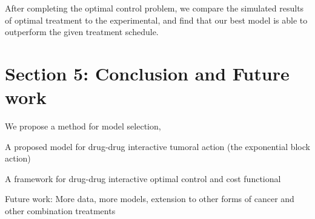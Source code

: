 \documentclass{article}
\begin{document}
After completing the optimal control problem, we compare the simulated results of optimal treatment to the experimental, and find that our best model is able to outperform the given treatment schedule. 



\section{Section 5: Conclusion and Future work}

We propose a method for model selection, 

A proposed model for drug-drug interactive tumoral action (the exponential block action)

A framework for drug-drug interactive optimal control and cost functional


Future work:
More data, more models, extension to other forms of cancer and other combination treatments
\end{document}
